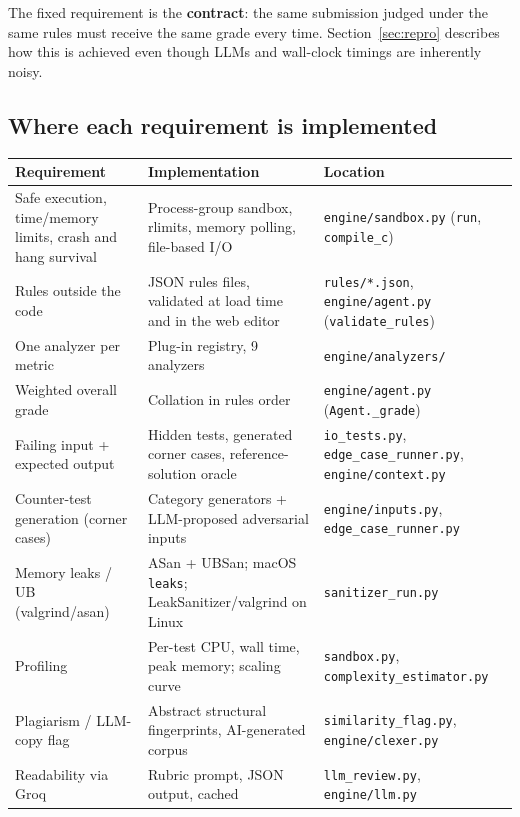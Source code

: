 \documentclass[11pt,a4paper]{article}
\newcommand{\file}[1]{\nolinkurl{#1}}
\newcommand{\fn}[1]{\nolinkurl{#1}}
\begin{document}
The fixed requirement is the \textbf{contract}: the same submission judged under the same rules must
receive the same grade every time. Section~\ref{sec:repro} describes how this is achieved even though
LLMs and wall-clock timings are inherently noisy.

\subsection{Where each requirement is implemented}

\begin{longtable}{@{}>{\raggedright\arraybackslash}p{4.3cm}>{\raggedright\arraybackslash}p{5.2cm}>{\raggedright\arraybackslash}p{5.6cm}@{}}
\toprule
\textbf{Requirement} & \textbf{Implementation} & \textbf{Location} \\
\midrule
\endhead
Safe execution, time/memory limits, crash and hang survival & Process-group sandbox, rlimits, memory polling, file-based I/O & \file{engine/sandbox.py} (\fn{run}, \fn{compile_c}) \\
Rules outside the code & JSON rules files, validated at load time and in the web editor & \file{rules/*.json}, \file{engine/agent.py} (\fn{validate_rules}) \\
One analyzer per metric & Plug-in registry, 9 analyzers & \file{engine/analyzers/} \\
Weighted overall grade & Collation in rules order & \file{engine/agent.py} (\fn{Agent._grade}) \\
Failing input + expected output & Hidden tests, generated corner cases, reference-solution oracle & \file{io_tests.py}, \file{edge_case_runner.py}, \file{engine/context.py} \\
Counter-test generation (corner cases) & Category generators + LLM-proposed adversarial inputs & \file{engine/inputs.py}, \file{edge_case_runner.py} \\
Memory leaks / UB (valgrind/asan) & ASan + UBSan; macOS \texttt{leaks}; LeakSanitizer/valgrind on Linux & \file{sanitizer_run.py} \\
Profiling & Per-test CPU, wall time, peak memory; scaling curve & \file{sandbox.py}, \file{complexity_estimator.py} \\
Plagiarism / LLM-copy flag & Abstract structural fingerprints, AI-generated corpus & \file{similarity_flag.py}, \file{engine/clexer.py} \\
Readability via Groq & Rubric prompt, JSON output, cached & \file{llm_review.py}, \file{engine/llm.py} \\

\end{longtable}
\end{document}
